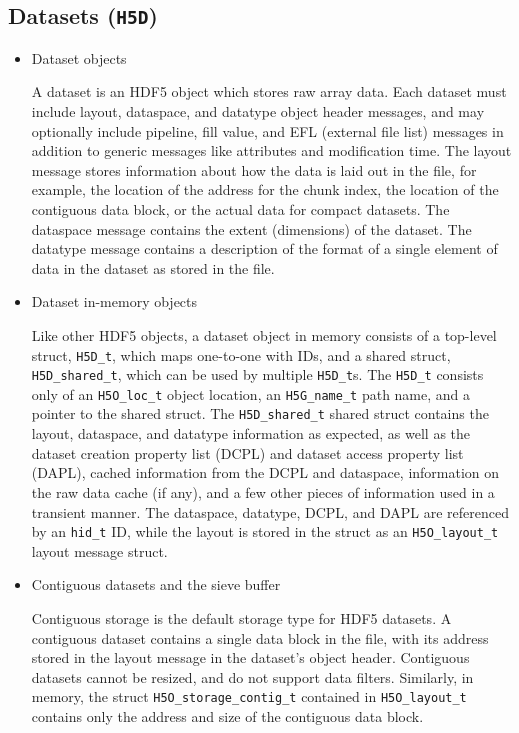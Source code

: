 \subsection{Datasets (\texttt{H5D})}


\begin{itemize}
    \item Dataset objects

A dataset is an HDF5 object which stores raw array data. Each dataset must include layout, dataspace, and datatype object header messages, and may optionally include pipeline, fill value, and EFL (external file list) messages in addition to generic messages like attributes and modification time. The layout message stores information about how the data is laid out in the file, for example, the location of the address for the chunk index, the location of the contiguous data block, or the actual data for compact datasets. The dataspace message contains the extent (dimensions) of the dataset. The datatype message contains a description of the format of a single element of data in the dataset as stored in the file.

    \item Dataset in-memory objects

Like other HDF5 objects, a dataset object in memory consists of a top-level struct, \texttt{H5D\_t}, which maps one-to-one with IDs, and a shared struct, \texttt{H5D\_shared\_t}, which can be used by multiple \texttt{H5D\_t}s. The \texttt{H5D\_t} consists only of an \texttt{H5O\_loc\_t} object location, an \texttt{H5G\_name\_t} path name, and a pointer to the shared struct. The \texttt{H5D\_shared\_t} shared struct contains the layout, dataspace, and datatype information as expected, as well as the dataset creation property list (DCPL) and dataset access property list (DAPL), cached information from the DCPL and dataspace, information on the raw data cache (if any), and a few other pieces of information used in a transient manner. The dataspace, datatype, DCPL, and DAPL are referenced by an \texttt{hid\_t} ID, while the layout is stored in the struct as an \texttt{H5O\_layout\_t} layout message struct.

    \item Contiguous datasets and the sieve buffer

Contiguous storage is the default storage type for HDF5 datasets. A contiguous dataset contains a single data block in the file, with its address stored in the layout message in the dataset's object header. Contiguous datasets cannot be resized, and do not support data filters. Similarly, in memory, the struct \texttt{H5O\_storage\_contig\_t} contained in \texttt{H5O\_layout\_t} contains only the address and size of the contiguous data block.


\end{itemize}
